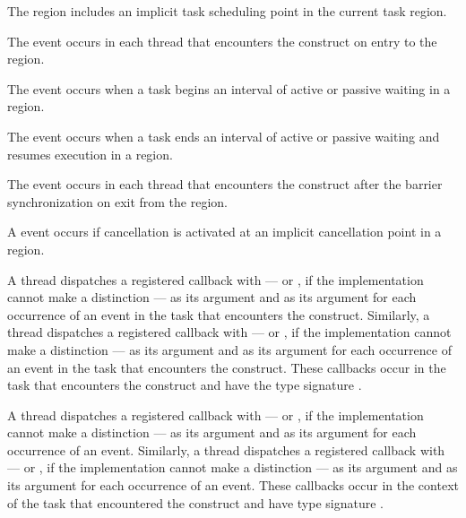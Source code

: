 The  region includes an implicit task scheduling point in the current 
task region.

\events

The  event occurs in each thread that encounters the
 construct on entry to the  region.

The  event occurs when a task begins an interval 
of active or passive waiting in a  region.

The  event occurs when a task ends an interval of 
active or passive waiting and resumes execution in a  region.

The  event occurs in each thread that encounters the
 construct after the barrier synchronization on exit from the
 region.

A  event occurs if cancellation is activated at an implicit 
cancellation point in a  region.

\tools

A thread dispatches a registered 
callback with  --- or
, if the implementation cannot make a
distinction --- as its  argument and  
as its  argument for each occurrence of an  
event in the task that encounters the  construct. Similarly, 
a thread dispatches a registered  callback 
with  --- or , 
if the implementation cannot make a distinction --- as its  argument 
and  as its  argument for each  occurrence 
of an  event in the task that encounters the 
 construct. These callbacks occur in the task that encounters 
the  construct and have the type signature 
.

A thread dispatches a registered  callback
with  --- or , 
if the implementation cannot make a distinction --- as its  argument and
 as its  argument for each occurrence of 
an  event. Similarly, a thread dispatches a 
registered  callback with 
 --- or , 
if the implementation cannot make a distinction --- as its  argument and
 as its  argument for each occurrence of an 
 event. These callbacks occur in the context of 
the task that encountered the  construct and have type signature 
.

